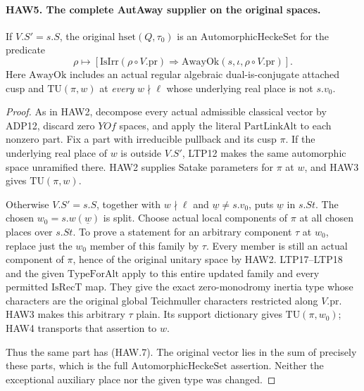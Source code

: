 \paragraph{HAW5. The complete AutAway supplier on the original spaces.}
\label{claim:HAW5}
If $V.S'=s.S$, the original $\mathrm{hset}(Q,\tau_0)$ is
an $\mathrm{AutomorphicHeckeSet}$ for the predicate
\[
 \rho\longmapsto
 [\mathrm{IsIrr}(\rho\circ V.\mathrm{pr})
       \Longrightarrow\mathrm{AwayOk}(s,\iota,
                                      \rho\circ V.\mathrm{pr})].
 \tag{HAW.7}
\]
Here $\mathrm{AwayOk}$ includes an actual regular algebraic
dual-is-conjugate attached cusp and $\mathrm{TU}(\pi,w)$
at \emph{every} $w\nmid\ell$ whose underlying real place
is not $s.v_0$.
\begin{proof}
As in HAW2, decompose every actual admissible classical vector
by ADP12, discard zero $YOf$ spaces, and apply the literal
$\mathrm{PartLinkAlt}$ to each nonzero part.  Fix a part with
irreducible pullback and its cusp $\pi$.  If the underlying
real place of $w$ is outside $V.S'$, LTP12 makes the same
automorphic space unramified there.  HAW2 supplies Satake
parameters for $\pi$ at $w$, and HAW3 gives
$\mathrm{TU}(\pi,w)$.

Otherwise $V.S'=s.S$, together with $w\nmid\ell$ and
$\underline w\ne s.v_0$, puts $\underline w$ in $s.St$.
The chosen $w_0=s.w(\underline w)$ is split.  Choose actual
local components of $\pi$ at all chosen places over $s.St$.
To prove a statement for an arbitrary component $\tau$ at
$w_0$, replace just the $w_0$ member of this family by $\tau$.
Every member is still an actual component of $\pi$, hence of
the original unitary space by HAW2.  LTP17--LTP18 and the
given $\mathrm{TypeForAlt}$ apply to this entire updated
family and every permitted $\mathrm{IsRecT}$ map.  They give
the exact zero-monodromy inertia type whose characters are
the original global Teichmuller characters restricted along
$V.\mathrm{pr}$.  HAW3 makes this arbitrary $\tau$ plain.
Its support dictionary gives $\mathrm{TU}(\pi,w_0)$; HAW4
transports that assertion to $w$.

Thus the same part has (HAW.7).  The original vector lies in
the sum of precisely these parts, which is the full
$\mathrm{AutomorphicHeckeSet}$ assertion.  Neither the
exceptional auxiliary place nor the given type was changed.
\end{proof}


